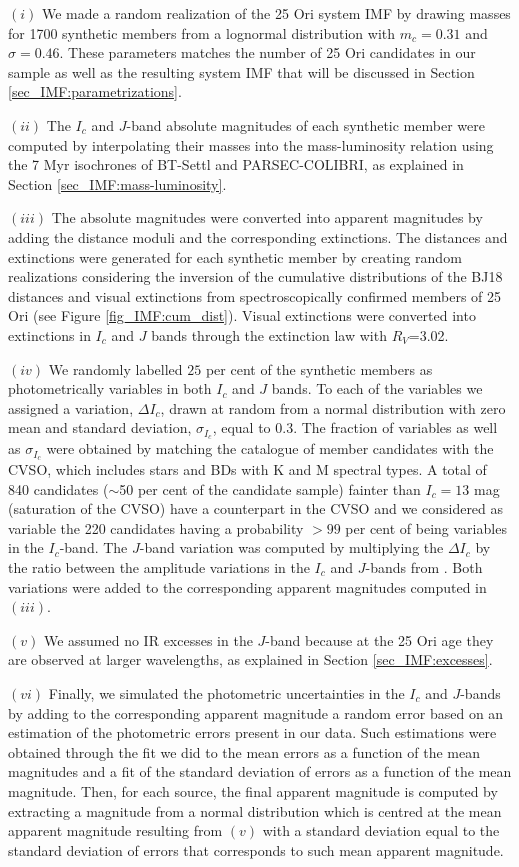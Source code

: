 \documentclass[12pt]{article}
\begin{document}
$(i)$ We made a random realization of the 25 Ori system IMF by drawing masses for 1700 synthetic members from a lognormal distribution with $m_c=0.31$ and $\sigma=0.46$. These parameters matches the number of 25 Ori candidates in our sample as well as the resulting system IMF that will be discussed in Section \ref{sec_IMF:parametrizations}. 

$(ii)$ The $I_c$ and $J$-band absolute magnitudes of each synthetic member were computed by interpolating their masses into the mass-luminosity relation using the 7 Myr isochrones of BT-Settl and PARSEC-COLIBRI, as explained in Section \ref{sec_IMF:mass-luminosity}.

$(iii)$ The absolute magnitudes were converted into apparent magnitudes by adding the distance moduli and the corresponding extinctions. The distances and extinctions were generated for each synthetic member by creating random realizations considering the inversion of the cumulative distributions of the BJ18 distances and visual extinctions from spectroscopically confirmed members of 25 Ori (see Figure \ref{fig_IMF:cum_dist}). Visual extinctions were converted into extinctions in $I_c$ and $J$ bands through the \cite{Rieke-Lebofsky1985} extinction law with $R_V$=3.02.

$(iv)$ We randomly labelled $25$ per cent of the synthetic members as photometrically variables in both $I_c$ and $J$ bands. To each of the variables we assigned a variation, $\Delta I_c$, drawn at random from a normal distribution with zero mean and standard deviation, $\sigma _{I_c}$, equal to 0.3. The fraction of variables as well as $\sigma _{I_c}$ were obtained by matching the catalogue of member candidates with the CVSO, which includes stars and BDs with K and M spectral types. A total of 840 candidates ($\sim$50 per cent of the candidate sample) fainter than $I_c=13$ mag (saturation of the CVSO) have a counterpart in the CVSO and we considered as variable the 220 candidates having a probability $>99$ per cent of being variables in the $I_c$-band. The $J$-band variation was computed by multiplying the $\Delta I_c$ by the ratio between the amplitude variations in the $I_c$ and $J$-bands from \cite{Scholz2009}. Both variations were added to the corresponding apparent magnitudes computed in $(iii)$.

$(v)$ We assumed no IR excesses in the $J$-band because at the 25 Ori age they are observed at larger wavelengths, as explained in Section \ref{sec_IMF:excesses}.

$(vi)$ Finally, we simulated the photometric uncertainties in the $I_c$ and $J$-bands by adding to the corresponding apparent magnitude a random error based on an estimation of the photometric errors present in our data. Such estimations were obtained through the fit we did to the mean errors as a function of the mean magnitudes and a fit of the standard deviation of errors as a function of the mean magnitude. Then, for each source, the final apparent magnitude is computed by extracting a magnitude from a normal distribution which is centred at the mean apparent magnitude resulting from $(v)$ with a standard deviation equal to the standard deviation of errors that corresponds to such mean apparent magnitude.
\end{document}
